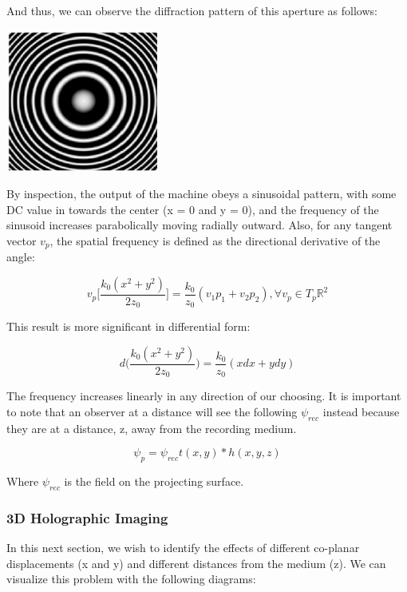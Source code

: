 \documentclass[12pt]{article}
\begin{document}
And thus, we can observe the diffraction pattern of this aperture as follows:

\begin{center}
\includegraphics[width=50mm]{tupac8.png}
\end{center}

By inspection, the output of the machine obeys a sinusoidal pattern, with some DC value in towards the center (x = 0 and y = 0), and the frequency
of the sinusoid increases parabolically moving radially outward.
Also, for any tangent vector \(v_{p}\), the spatial frequency is defined as the directional derivative of the angle:

\begin{equation}
	v_{p}\bigg[ \frac{k_{0}(x^2 + y^2)}{2z_{0}} \bigg] = \frac{k_{0}}{z_{0}}(v_{1}p_{1} + v_{2}p_{2}), \forall v_{p} \in T_{p} \mathbb{R}^2
\end{equation}

This result is more significant in differential form:

\begin{equation}
	d \bigg( \frac{k_{0}(x^2 + y^2)}{2z_{0}} \bigg) = \frac{k_{0}}{z_{0}}(xdx + ydy)
\end{equation}

The frequency increases linearly in any direction of our choosing.
It is important to note that an observer at a distance will see the following
\(\psi_{rec}\) instead because they are at a distance, z, away from the
recording medium.

\begin{equation}
	\psi_{p} = \psi_{rec}t(x,y)*h(x,y,z)
\end{equation}

Where \(\psi_{rec}\) is the field on the projecting surface.

\subsubsection{3D Holographic Imaging}

In this next section, we wish to identify the effects of different co-planar displacements
(x and y) and different distances from the medium (z). We can visualize this problem with the following diagrams:
\end{document}
